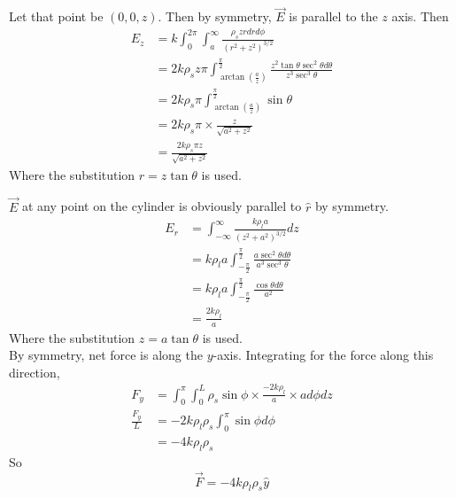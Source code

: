 \documentclass[answers]{exam}
\begin{document}
\begin{questions}

\begin{solution}
	Let that point be $(0,0,z)$. Then by symmetry, $\vec{E}$ is parallel to the $z$ axis. Then
	\begin{align*}
		E_z &= k\int_0^{2\pi}\int_a^\infty \frac{\rho_szrdrd\phi}{(r^2+z^2)^{3/2}} \\
			&= 2k\rho_sz\pi \int_{\arctan\left(\frac{a}{z}\right)}^{\frac{\pi}{2}} \frac{z^2\tan\theta\sec^2\theta d\theta}{z^3\sec^3\theta} \\
			&= 2k\rho_s\pi \int_{\arctan\left(\frac{a}{z}\right)}^{\frac{\pi}{2}} \sin\theta \\
			&= 2k\rho_s\pi \times \frac{z}{\sqrt{a^2+z^2}} \\
			&= \frac{2k\rho_s\pi z}{\sqrt{a^2+z^2}}
	\end{align*}
	Where the substitution $r=z\tan\theta$ is used.
\end{solution}

 \label{this}

\begin{solution}
	$\vec{E}$ at any point on the cylinder is obviously parallel to $\hat{r}$ by symmetry.
	\begin{align*}
		E_r &= \int_{-\infty}^\infty \frac{k\rho_la}{(z^2+a^2)^{3/2}} dz \\
		    &= k\rho_la \int_{-\frac{\pi}{2}}^{\frac{\pi}{2}} \frac{a\sec^2\theta d\theta}{a^3\sec^3\theta} \\
		    &= k\rho_la \int_{-\frac{\pi}{2}}^{\frac{\pi}{2}} \frac{\cos\theta d\theta}{a^2} \\
		    &= \frac{2k\rho_l}{a}
	\end{align*}
	Where the substitution $z=a\tan\theta$ is used. \\
	By symmetry, net force is along the $y$-axis. Integrating for the force along this direction,
	\begin{align*}
		F_y &= \int_0^\pi\int_0^L \rho_s\sin\phi \times \frac{-2k\rho_l}{a} \times ad\phi dz \\
		\frac{F_y}{L} &= -2k\rho_l\rho_s \int_0^\pi \sin\phi d\phi \\
			      &= -4k\rho_l\rho_s
	\end{align*}
	So
	$$\vec{F} = -4k\rho_l\rho_s\hat{y}$$
\end{solution}


\end{questions}
\end{document}
